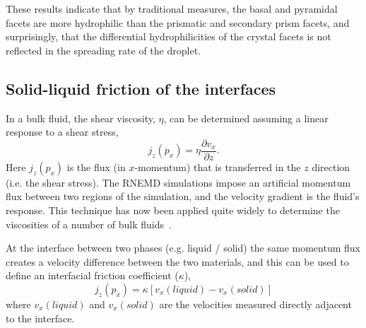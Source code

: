 \documentclass{pnastwo}
\begin{document}
\begin{article}
These results indicate that by traditional measures, the basal and
pyramidal facets are more hydrophilic than the prismatic and secondary
prism facets, and surprisingly, that the differential hydrophilicities
of the crystal facets is not reflected in the spreading rate of the
droplet.


\subsection{Solid-liquid friction of the interfaces}
In a bulk fluid, the shear viscosity, $\eta$, can be determined
assuming a linear response to a shear stress,
\begin{equation}\label{Shenyu-11}
j_{z}(p_{x}) = \eta \frac{\partial v_{x}}{\partial z}.
\end{equation}
Here $j_{z}(p_{x})$ is the flux (in $x$-momentum) that is transferred
in the $z$ direction (i.e. the shear stress). The RNEMD simulations
impose an artificial momentum flux between two regions of the
simulation, and the velocity gradient is the fluid's response. This
technique has now been applied quite widely to determine the
viscosities of a number of bulk fluids~\cite{Muller99,Bordat02,Cavalcanti07}.

At the interface between two phases (e.g. liquid / solid) the same
momentum flux creates a velocity difference between the two materials,
and this can be used to define an interfacial friction coefficient
($\kappa$),
\begin{equation}\label{Shenyu-13}
j_{z}(p_{x}) = \kappa \left[ v_{x}(liquid) - v_{x}(solid) \right]
\end{equation}
where $v_{x}(liquid)$ and $v_{x}(solid)$ are the velocities measured
directly adjacent to the interface.


\end{article}
\end{document}
